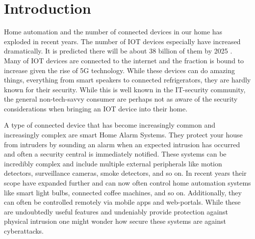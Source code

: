 \chapter{Introduction} \label{ch:introduction}
% 
% 
% 


Home automation and the number of connected devices in our home has exploded in recent years. The number of \gls{IOT} devices especially have increased dramatically. It is predicted there will be about 38 billion of them by 2025 \cite{ieee-iot}. Many of \gls{IOT} devices are connected to the internet and the fraction is bound to increase given the rise of 5G technology. While these devices can do amazing things, everything from smart speakers to connected refrigerators, they are hardly known for their security. While this is well known in the IT-security community, the general non-tech-savvy consumer are perhaps not as aware of the security considerations when bringing an \gls{IOT} device into their home.

A type of connected device that has become increasingly common and increasingly complex are smart Home Alarm Systems. They protect your house from intruders by sounding an alarm when an expected intrusion has occurred and often a security central is immediately notified. These systems can be incredibly complex and include multiple external peripherals like motion detectors, surveillance cameras, smoke detectors, and so on. In recent years their scope have expanded further and can now often control home automation systems like smart light bulbs, connected coffee machines, and so on. Additionally, they can often be controlled remotely via mobile apps and web-portals. While these are undoubtedly useful features and undeniably provide protection against physical intrusion one might wonder how secure these systems are against cyberattacks.

